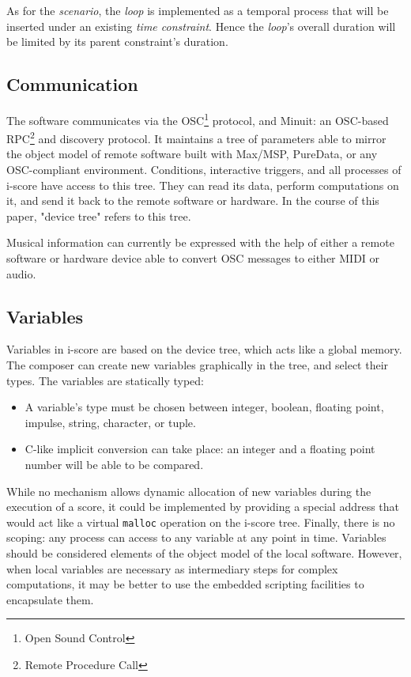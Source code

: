 \documentclass{article}
\newcommand{\scenario}{\textit{scenario}\xspace}
\newcommand{\Loop}{\textit{loop}\xspace}
\newcommand{\timeconstraint}{\textit{time constraint}\xspace}
\begin{document}
As for the \scenario, the \Loop is implemented as a temporal process that will be inserted under an existing \timeconstraint. 
Hence the \Loop's overall duration will be limited by its parent constraint's duration.

\subsection{Communication}
The software communicates via the OSC\footnote{Open Sound Control} protocol, and Minuit: an OSC-based RPC\footnote{Remote Procedure Call} and discovery protocol.
It maintains a tree of parameters able to mirror the object model of remote software built with Max/MSP, PureData, or any OSC-compliant environment. 
Conditions, interactive triggers, and all processes of i-score have access to this tree.
They can read its data, perform computations on it, and send it back to the remote software or hardware.
In the course of this paper, "device tree" refers to this tree.

Musical information can currently be expressed with the help of either a remote software or hardware device able to convert OSC messages to either MIDI or audio.

\subsection{Variables}
Variables in i-score are based on the device tree, which acts like a global memory. 
The composer can create new variables graphically in the tree, and select their types.
The variables are statically typed: 
\begin{itemize}
    \item A variable's type must be chosen between integer, boolean, floating point, impulse, string, character, or tuple.
    \item C-like implicit conversion can take place: an integer and a floating point number will be able to be compared.
\end{itemize} 

While no mechanism allows dynamic allocation of new variables during the execution of a score, it could be implemented by providing a special address that would act like a virtual \lstinline|malloc| operation on the i-score tree.
Finally, there is no scoping: any process can access to any variable at any point in time.
Variables should be considered elements of the object model of the local software.
However, when local variables are necessary as intermediary steps for complex computations, it 
may be better to use the embedded scripting facilities to encapsulate them.
\end{document}
